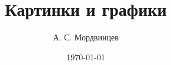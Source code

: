 \documentclass[a4paper,14pt]{extreport}
\begin{document}
\title{Картинки и графики}
\author{А. С. Мордвинцев}
\date{\today}


\sloppy  %

\maketitle

\setcounter{page}{3}

\tableofcontents








\end{document}
